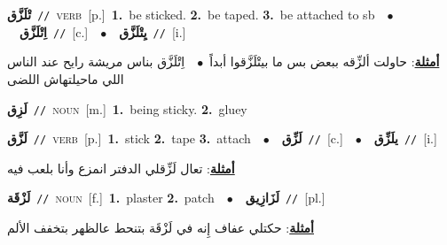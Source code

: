 \documentclass[10pt,a4paper,twoside]{article} %
\begin{document}
\begin{multicols}{2}
{\setlength\topsep{0pt}\textbf{\foreignlanguage{arabic}{تْلَزَّق}}\ {\color{gray}\texttt{//}\color{black}}\ \textsc{verb}\ [p.]\ \textbf{1.}~be sticked.  \textbf{2.}~be taped.  \textbf{3.}~be attached to sb\ \ $\bullet$\ \ \setlength\topsep{0pt}\textbf{\foreignlanguage{arabic}{اِتْلَزَّق}}\ {\color{gray}\texttt{//}\color{black}}\ [c.]\ \ $\bullet$\ \ \setlength\topsep{0pt}\textbf{\foreignlanguage{arabic}{يِتْلَزَّق}}\ {\color{gray}\texttt{//}\color{black}}\ [i.]\  \begin{flushright}\color{gray}\foreignlanguage{arabic}{\textbf{\underline{\foreignlanguage{arabic}{أمثلة}}}: حاولت ألزِّقه ببعض بس ما بيتْلَزَّقوا أبداً\ $\bullet$\ \  اِتْلَزَّق بناس مريشة رايح عند الناس اللي ماحيلتهاش اللضى}\end{flushright}\color{black}} \vspace{2mm}

{\setlength\topsep{0pt}\textbf{\foreignlanguage{arabic}{لَزِق}}\ {\color{gray}\texttt{//}\color{black}}\ \textsc{noun}\ [m.]\ \textbf{1.}~being sticky.  \textbf{2.}~gluey\ } \vspace{2mm}

{\setlength\topsep{0pt}\textbf{\foreignlanguage{arabic}{لَزَّق}}\ {\color{gray}\texttt{//}\color{black}}\ \textsc{verb}\ [p.]\ \textbf{1.}~stick  \textbf{2.}~tape  \textbf{3.}~attach\ \ $\bullet$\ \ \setlength\topsep{0pt}\textbf{\foreignlanguage{arabic}{لَزِّق}}\ {\color{gray}\texttt{//}\color{black}}\ [c.]\ \ $\bullet$\ \ \setlength\topsep{0pt}\textbf{\foreignlanguage{arabic}{يلَزِّق}}\ {\color{gray}\texttt{//}\color{black}}\ [i.]\  \begin{flushright}\color{gray}\foreignlanguage{arabic}{\textbf{\underline{\foreignlanguage{arabic}{أمثلة}}}: تعال لَزِّقلي الدفتر انمزع وأنا بلعب فيه}\end{flushright}\color{black}} \vspace{2mm}

{\setlength\topsep{0pt}\textbf{\foreignlanguage{arabic}{لَزْقَة}}\ {\color{gray}\texttt{//}\color{black}}\ \textsc{noun}\ [f.]\ \textbf{1.}~plaster  \textbf{2.}~patch\ \ $\bullet$\ \ \setlength\topsep{0pt}\textbf{\foreignlanguage{arabic}{لَزَازِيق}}\ {\color{gray}\texttt{//}\color{black}}\ [pl.]\  \begin{flushright}\color{gray}\foreignlanguage{arabic}{\textbf{\underline{\foreignlanguage{arabic}{أمثلة}}}: حكتلي عفاف إِنه في لَزْقَة بتنحط عالظهر بتخفف الألم}\end{flushright}\color{black}} \vspace{2mm}


\end{multicols}
\end{document}
